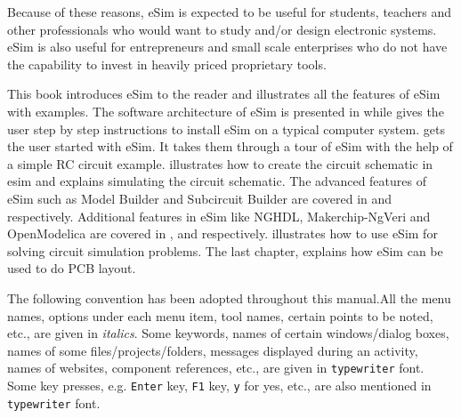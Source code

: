 Because of these reasons, eSim is expected to be useful for
students, teachers and other professionals who would want to study
and/or design electronic systems.  eSim is also useful for
entrepreneurs and small scale enterprises who do not have the
capability to invest in heavily priced proprietary tools.

This book introduces eSim to the reader and illustrates all the
features of eSim with examples. The software architecture of eSim is
presented in  while  gives the user step 
by step instructions to install eSim on a typical computer system. 
 gets the user started with eSim. It takes them through 
a tour of eSim with the help of a simple RC circuit example. 
 illustrates how to create the circuit schematic in esim 
and  explains simulating the circuit schematic. The 
advanced features of eSim such as Model Builder and Subcircuit Builder 
are covered in  and  respectively. 
Additional features in eSim like NGHDL, Makerchip-NgVeri and 
OpenModelica are covered in ,  and  
respectively.  illustrates how to use eSim for solving 
circuit simulation problems. The last chapter,  explains 
how eSim can be used to do PCB layout.

The following convention has been adopted throughout this manual.All
the menu names, options under each menu item, tool names, certain
points to be noted, etc., are given in \textit{italics}.  Some
keywords, names of certain windows/dialog boxes, names of some
files/projects/folders, messages displayed during an activity, names
of websites, component references, etc., are given in {\tt typewriter}
font. Some key presses, e.g. {\tt Enter} key, {\tt F1} key, {\tt y}
for yes, etc., are also mentioned in {\tt typewriter} font.
